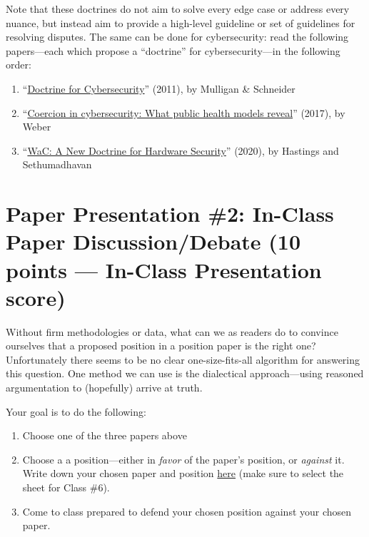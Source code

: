 \documentclass[11pt]{article}
\begin{document}
Note that these doctrines do not aim to solve every edge case or address every nuance, but instead aim to provide a high-level guideline or set of guidelines for resolving disputes. 
The same can be done for cybersecurity:
read the following papers---each which propose a ``doctrine'' for cybersecurity---in the following order: 

\begin{enumerate}
    \item ``\href{https://direct.mit.edu/daed/article/140/4/70/26918/Doctrine-for-Cybersecurity}{Doctrine for Cybersecurity}'' (2011), by Mulligan \& Schneider
    \item ``\href{https://academic.oup.com/cybersecurity/article/3/3/173/3836936?searchresult=1}{Coercion in cybersecurity: What public health models reveal}'' (2017), by Weber
    \item ``\href{https://dl.acm.org/doi/abs/10.1145/3411504.3421217}{WaC: A New Doctrine for Hardware Security}'' (2020), by Hastings and Sethumadhavan
\end{enumerate}


\section*{Paper Presentation \#2: In-Class Paper Discussion/Debate (10 points --- In-Class Presentation score)}

Without firm methodologies or data, what can we as readers do to convince ourselves that a proposed position in a position paper is the right one? 
Unfortunately there seems to be no clear one-size-fits-all algorithm for answering this question.
One method we can use is the dialectical approach---using reasoned argumentation to (hopefully) arrive at truth.

Your goal is to do the following:
\begin{enumerate}
    \item Choose one of the three papers above
    \item Choose a a position---either in \textit{favor} of the paper's position, or \textit{against} it. Write down your chosen paper and position \href{https://docs.google.com/spreadsheets/d/1SdaMpeCo4CE8o0U_irGhWmVXJYHybRWoiX4uwZYMhCE/edit?usp=sharing}{here} (make sure to select the sheet for Class \#6).
    \item Come to class prepared to defend your chosen position against your chosen paper. 
\end{enumerate}
\end{document}
